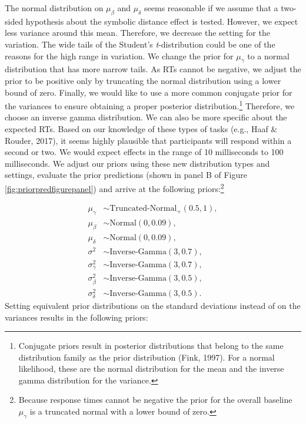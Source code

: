 \documentclass[
  english,
  doc,floatsintext]{apa6}
\begin{document}
The normal distribution on \(\mu_{\beta}\) and \(\mu_{\delta}\) seems reasonable if we assume that a two-sided hypothesis about the symbolic distance effect is tested. However, we expect less variance around this mean. Therefore, we decrease the setting for the variation. The wide tails of the Student's \emph{t}-distribution could be one of the reasons for the high range in variation. We change the prior for \(\mu_{\gamma}\) to a normal distribution that has more narrow tails. As RTs cannot be negative, we adjust the prior to be positive only by truncating the normal distribution using a lower bound of zero. Finally, we would like to use a more common conjugate prior for the variances to ensure obtaining a proper posterior distribution.\footnote{Conjugate priors result in posterior distributions that belong to the same distribution family as the prior distribution (Fink, 1997). For a normal likelihood, these are the normal distribution for the mean and the inverse gamma distribution for the variance.} Therefore, we choose an inverse gamma distribution. We can also be more specific about the expected RTs. Based on our knowledge of these types of tasks (e.g., Haaf \& Rouder, 2017), it seems highly plausible that participants will respond within a second or two. We would expect effects in the range of 10 milliseconds to 100 milliseconds. We adjust our priors using these new distribution types and settings, evaluate the prior predictions (shown in panel B of Figure \ref{fig:priorpredfigurepanel}) and arrive at the following priors:\footnote{Because response times cannot be negative the prior for the overall baseline \(\mu_\gamma\) is a truncated normal with a lower bound of zero.}

\begin{equation}
\begin{aligned}
\mu_{\gamma} &\sim \text{Truncated-Normal}_{+}(0.5, 1), \label{eq:chosenpriors2var} \\
\mu_{\beta} &\sim \text{Normal}(0, 0.09), \\
\mu_{\delta} &\sim \text{Normal}(0, 0.09), \\
\sigma^2 &\sim \text{Inverse-Gamma}(3, 0.7),  \\
\sigma^2_{\gamma} &\sim \text{Inverse-Gamma}(3, 0.7), \\   
\sigma^2_{\beta} &\sim \text{Inverse-Gamma}(3, 0.5), \\   
\sigma^2_{\delta} &\sim \text{Inverse-Gamma}(3, 0.5).    
\end{aligned}
\end{equation}
Setting equivalent prior distributions on the standard deviations instead of on the variances results in the following priors:
\end{document}

